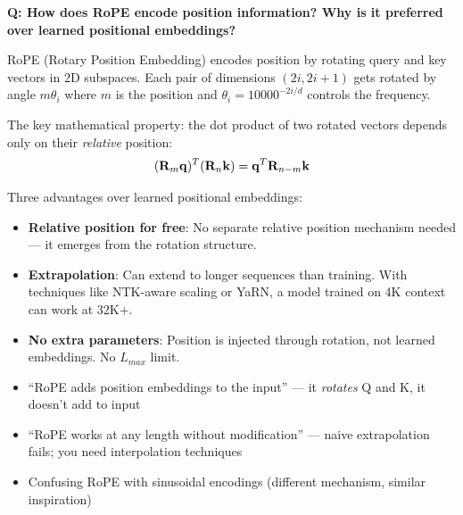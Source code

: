 \begin{interviewq}
\textbf{Q: How does RoPE encode position information? Why is it preferred over learned positional embeddings?}

 \quad {} \quad \badgefreq{\freqhigh}

\stronganswer RoPE (Rotary Position Embedding) encodes position by rotating query and key vectors in 2D subspaces. Each pair of dimensions $(2i, 2i+1)$ gets rotated by angle $m\theta_i$ where $m$ is the position and $\theta_i = 10000^{-2i/d}$ controls the frequency.

The key mathematical property: the dot product of two rotated vectors depends only on their \textit{relative} position:
\[(\mathbf{R}_m \mathbf{q})^T (\mathbf{R}_n \mathbf{k}) = \mathbf{q}^T \mathbf{R}_{n-m} \mathbf{k}\]

Three advantages over learned positional embeddings:
\begin{itemize}
    \item \textbf{Relative position for free}: No separate relative position mechanism needed --- it emerges from the rotation structure.
    \item \textbf{Extrapolation}: Can extend to longer sequences than training. With techniques like NTK-aware scaling or YaRN, a model trained on 4K context can work at 32K+.
    \item \textbf{No extra parameters}: Position is injected through rotation, not learned embeddings. No $L_{max}$ limit.
\end{itemize}

\redflags
\begin{itemize}
    \item ``RoPE adds position embeddings to the input'' --- it \textit{rotates} Q and K, it doesn't add to input
    \item ``RoPE works at any length without modification'' --- naive extrapolation fails; you need interpolation techniques
    \item Confusing RoPE with sinusoidal encodings (different mechanism, similar inspiration)
\end{itemize}



\end{interviewq}
